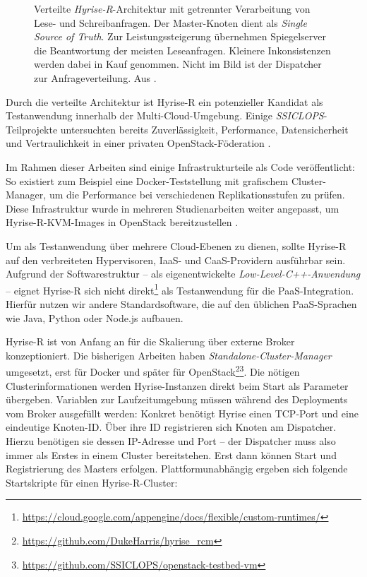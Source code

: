 \begin{figure}[ht]
	\centering
	\def\svgwidth{0.9\textwidth}
	\textsf{
	}
	\caption{Verteilte \emph{Hyrise-R}-Architektur mit getrennter Verarbeitung von Lese- und Schreibanfragen. Der Master-Knoten dient als \emph{Single Source of Truth}. Zur Leistungssteigerung übernehmen Spiegelserver die Beantwortung der meisten Leseanfragen. Kleinere Inkonsistenzen werden dabei in Kauf genommen. Nicht im Bild ist der Dispatcher zur Anfrageverteilung. Aus \cite{ssiclops:d42:experiments-measurements}.}	
	\label{fig:hyrise-r}
\end{figure}

Durch die verteilte Architektur ist Hyrise-R ein potenzieller Kandidat als Testanwendung innerhalb der Multi-Cloud-Umgebung. Einige \emph{SSICLOPS}-Teilprojekte untersuchten bereits Zuverlässigkeit, Performance, Datensicherheit und Vertraulichkeit in einer privaten OpenStack-Föderation \cite{ssiclops:d23:security-extensions, ssiclops:d42:experiments-measurements, bastian:2017:openstack-policies}. 

Im Rahmen dieser Arbeiten sind einige Infrastrukturteile als Code veröffentlicht: So existiert zum Beispiel eine Docker-Teststellung mit grafischem Cluster-Manager, um die Performance bei verschiedenen Replikationsstufen zu prüfen. Diese Infrastruktur wurde in mehreren Studienarbeiten weiter angepasst, um Hyrise-R-KVM-Images in OpenStack bereitzustellen \cite{eschrig:2016:ssiclops-masterproject, maschler:2017:ssiclops-masterproject}.

Um als Testanwendung über mehrere Cloud-Ebenen zu dienen, sollte Hyrise-R auf den verbreiteten Hypervisoren, IaaS- und CaaS-Providern ausführbar sein. Aufgrund der Softwarestruktur -- als eigenentwickelte \emph{Low-Level-C++-Anwendung} --  eignet Hyrise-R sich nicht direkt\footnote{\url{https://cloud.google.com/appengine/docs/flexible/custom-runtimes/}} als Testanwendung für die PaaS-Integration. Hierfür nutzen wir andere Standardsoftware, die auf den üblichen PaaS-Sprachen wie Java, Python oder Node.js aufbauen.

Hyrise-R ist von Anfang an für die Skalierung über externe Broker konzeptioniert. Die bisherigen Arbeiten haben \emph{Standalone-Cluster-Manager} umgesetzt, erst für Docker und später für OpenStack\footnote{\url{https://github.com/DukeHarris/hyrise_rcm}}\footnote{\url{https://github.com/SSICLOPS/openstack-testbed-vm}}. Die nötigen Clusterinformationen werden Hyrise-Instanzen direkt beim Start als Parameter übergeben. Variablen zur Laufzeitumgebung müssen während des Deployments vom Broker ausgefüllt werden: Konkret benötigt Hyrise einen TCP-Port und eine eindeutige Knoten-ID. Über ihre ID registrieren sich Knoten am Dispatcher. Hierzu benötigen sie dessen IP-Adresse und Port -- der Dispatcher muss also immer als Erstes in einem Cluster bereitstehen. Erst dann können Start und Registrierung des Masters erfolgen. Plattformunabhängig ergeben sich folgende Startskripte für einen Hyrise-R-Cluster:

